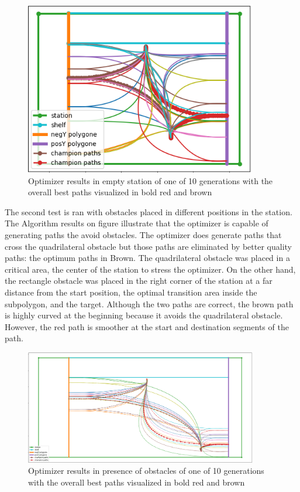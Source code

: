 \begin{figure}[H]
    \begin{center}
        \includegraphics[width=4in]{images/Chap3/Gen1_crop.png} %
        \caption{Optimizer results in empty station of one of 10 generations with the overall best paths 
        visualized in bold red and brown}
        \label{OptResult1}
        \end{center}    
\end{figure}


The second test is ran with obstacles placed in different positions in the station. 
The Algorithm results on figure  illustrate that the optimizer is capable of generating paths the avoid 
obstacles. The optimizer does generate paths that cross the quadrilateral obstacle but those paths 
are eliminated by better quality paths: the optimum paths in Brown. The quadrilateral obstacle was placed 
in a critical area, the center of the station to stress the optimizer. On the other hand, 
the rectangle obstacle was placed in the right corner of the station at a far distance from the start position,
the optimal transition area inside the subpolygon, and the target.
Although the two paths are  correct, the brown path is highly curved at the beginning because it avoids the 
quadrilateral obstacle. However, the red path is smoother at the start and destination segments of the path.

\begin{figure}[H]
    \begin{center}
        \includegraphics[width=4in]{images/Chap3/scenario3_crop.png} %
        \caption{Optimizer results in presence of obstacles of one of 10 generations with the overall best paths 
        visualized in bold red and brown}
        \label{OptResult2}
        \end{center}    
\end{figure}

